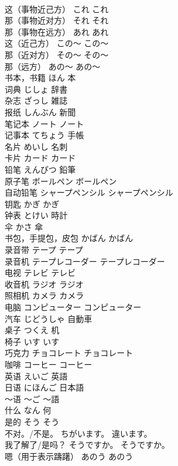 \documentclass[8pt]{extreport}
\begin{document}
\begin{CJK}{UTF8}{min}
\\	这（事物近己方）	これ	これ
\\	那（事物近对方）	それ	それ
\\	那（事物在远方）	あれ	あれ
\\	这（近己方）	この～	この～
\\	那（近对方）	その～	その～
\\	那（远方）	あの～	あの～
\\	书本，书籍	ほん	本
\\	词典	じしょ	辞書
\\	杂志	ざっし	雑誌
\\	报纸	しんぶん	新聞
\\	笔记本	ノート	ノート
\\	记事本	てちょう	手帳
\\	名片	めいし	名刺
\\	卡片	カード	カード
\\	铅笔	えんぴつ	鉛筆
\\	原子笔	ボールペン	ボールペン
\\	自动铅笔	シャープペンシル	シャープペンシル
\\	钥匙	かぎ	かぎ
\\	钟表	とけい	時計
\\	伞	かさ	傘
\\	书包，手提包，皮包	かばん	かばん
\\	录音带	テープ	テープ
\\	录音机	テープレコーダー	テープレコーダー
\\	电视	テレビ	テレビ
\\	收音机	ラジオ	ラジオ
\\	照相机	カメラ	カメラ
\\	电脑	コンピューター	コンピューター
\\	汽车	じどうしゃ	自動車
\\	桌子	つくえ	机
\\	椅子	いす	いす
\\	巧克力	チョコレート	チョコレート
\\	咖啡	コーヒー	コーヒー
\\	英语	えいご	英語
\\	日语	にほんご	日本語
\\	～语	～ご	～語
\\	什么	なん	何
\\	是的	そう	そう
\\	不对。/不是。	ちがいます。	違います。
\\	我了解了/是吗？	そうですか。	そうですか。
\\	嗯（用于表示躊躇）	あのう	あのう

\end{CJK}
\end{document}
